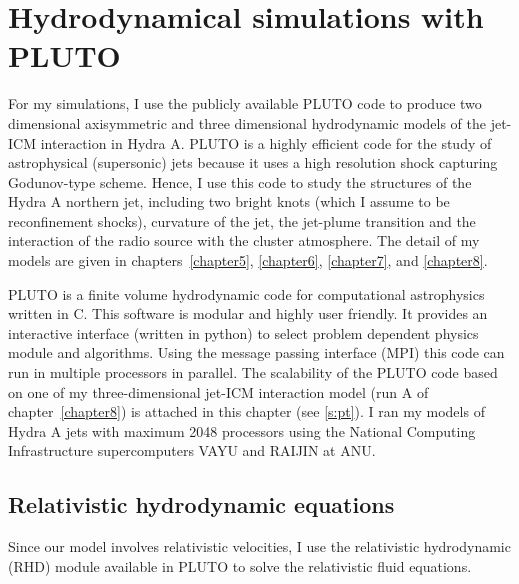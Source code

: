 \chapter{Hydrodynamical simulations with PLUTO} \label{chapter2}






For my simulations, I use the publicly available PLUTO code \citep{mignone07} to produce two dimensional axisymmetric and three dimensional hydrodynamic models of the jet-ICM interaction in Hydra A. 
PLUTO is a highly efficient code for the study of astrophysical (supersonic) jets because it uses a high resolution shock capturing Godunov-type scheme. Hence, I use this code to study the structures of the Hydra A northern jet, including two bright knots (which I assume to be reconfinement shocks), curvature of the jet, the jet-plume transition and the interaction of the radio source with the cluster atmosphere. The detail of my models are given in chapters~\ref{chapter5}, \ref{chapter6}, \ref{chapter7}, and \ref{chapter8}.

PLUTO is a finite volume hydrodynamic code for computational astrophysics written in C. This software is modular and highly user friendly. It provides an interactive interface (written in python) to select problem dependent physics module and algorithms. Using the message passing interface (MPI) this code can run in multiple processors in parallel. The scalability of the PLUTO code based on one of my three-dimensional jet-ICM interaction model (run A of chapter~\ref{chapter8}) is attached in this chapter (see \ref{s:pt}). I ran my models of Hydra A jets with maximum 2048 processors using the National Computing Infrastructure supercomputers VAYU and RAIJIN at ANU. 





\section{Relativistic hydrodynamic equations}
Since our model involves relativistic velocities, I use the relativistic hydrodynamic (RHD) module available in PLUTO to solve the relativistic fluid equations. 

